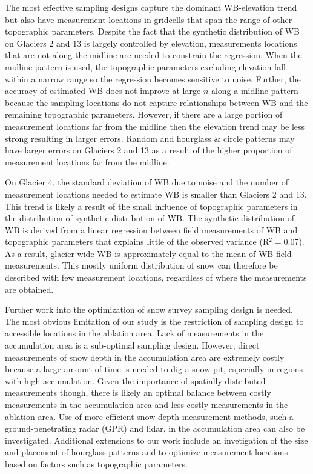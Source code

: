 \documentclass[twocolumn,letterpaper]{igs}
\begin{document}
The most effective sampling designs capture the dominant WB-elevation trend but also have measurement locations in gridcells that span the range of other topographic parameters. Despite the fact that the synthetic distribution of WB on Glaciers 2 and 13 is largely controlled by elevation, measurements locations that are not along the midline are needed to constrain the regression. When the midline pattern is used, the topographic parameters excluding elevation fall within a narrow range so the regression becomes sensitive to noise. Further, the accuracy of estimated WB does not improve at large $n$ along a midline pattern because the sampling locations do not capture relationships between WB and the remaining topographic parameters. However, if there are a large portion of measurement locations far from the midline then the elevation trend may be less strong resulting in larger errors. Random and hourglass \& circle patterns may have larger errors on Glaciers 2 and 13 as a result of the higher proportion of measurement locations far from the midline. 

On Glacier 4, the standard deviation of WB due to noise and the number of measurement locations needed to estimate WB is smaller than Glaciers 2 and 13. This trend is likely a result of the small influence of topographic parameters in the distribution of synthetic distribution of WB. The synthetic distribution of WB is derived from a linear regression between field measurements of WB and topographic parameters that explains little of the observed variance (R$^2=$0.07). As a result, glacier-wide WB is approximately equal to the mean of WB field measurements. This mostly uniform distribution of snow can therefore be described with few measurement locations, regardless of where the measurements are obtained. 

Further work into the optimization of snow survey sampling design is needed. The most obvious limitation of our study is the restriction of sampling design to accessible locations in the ablation area. Lack of measurements in the accumulation area is a sub-optimal sampling design. However, direct measurements of snow depth in the accumulation area are extremely costly because a large amount of time is needed to dig a snow pit, especially in regions with high accumulation. Given the importance of spatially distributed measurements though, there is likely an optimal balance between costly measurements in the accumulation area and less costly measurements in the ablation area. Use of more efficient snow-depth measurement methods, such a ground-penetrating radar (GPR) and lidar, in the accumulation area can also be investigated. Additional extensions to our work include an invetigation of the size and placement of hourglass patterns and to optimize measurement locations based on factors such as topographic parameters. 
\end{document}
